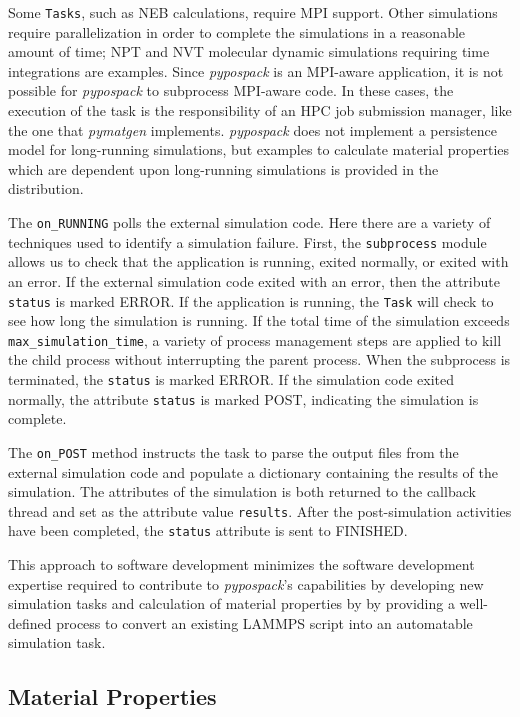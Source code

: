 Some \verb|Tasks|, such as NEB calculations, require MPI support.  Other simulations require parallelization in order to complete the simulations in a reasonable amount of time; NPT and NVT molecular dynamic simulations requiring time integrations are examples.
Since \emph{pypospack} is an MPI-aware application, it is not possible for \emph{pypospack} to subprocess MPI-aware code.  In these cases, the execution of the task is the responsibility of an HPC job submission manager, like the one that \emph{pymatgen} implements.  \emph{pypospack} does not implement a persistence model for long-running simulations, but examples to calculate material properties which are dependent upon long-running simulations is provided in the distribution.

The \verb|on_RUNNING| polls the external simulation code.  Here there are a variety of techniques used to identify a simulation failure.  First, the \verb|subprocess| module allows us to check that the application is running, exited normally, or exited with an error.  If the external simulation code exited with an error, then the attribute \verb|status| is marked ERROR.    If the application is running, the \verb|Task| will check to see how long the simulation is running. If the total time of the simulation exceeds \verb|max_simulation_time|, a variety of process management steps are applied to kill the child process without interrupting the parent process.  When the subprocess is terminated, the \verb|status| is marked ERROR.  If the simulation code exited normally, the attribute \verb|status| is marked POST, indicating the simulation is complete.

The \verb|on_POST| method instructs the task to parse the output files from the external simulation code and populate a dictionary containing the results of the simulation.  The attributes of the simulation is both returned to the callback thread and set as the attribute value \verb|results|.  After the post-simulation activities have been completed, the \verb|status| attribute is sent to FINISHED.

This approach to software development minimizes the software development expertise required to contribute to \emph{pypospack}'s capabilities by developing new simulation tasks and calculation of material properties by by providing a well-defined process to convert an existing LAMMPS script into an automatable simulation task.

\subsection{Material Properties}

